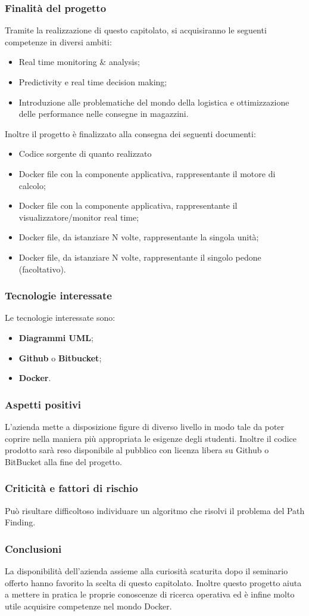 \subsubsection{Finalità del progetto}
Tramite la realizzazione di questo capitolato, si acquisiranno le seguenti competenze in diversi ambiti:
\begin{itemize}
	\item Real time monitoring \& analysis;
	\item Predictivity e real time decision making;
	\item Introduzione alle problematiche del mondo della logistica e ottimizzazione delle performance nelle consegne in magazzini.
\end{itemize}
Inoltre il progetto è finalizzato alla consegna dei seguenti documenti:
\begin{itemize}
	\item Codice sorgente di quanto realizzato
	\item Docker file con la componente applicativa, rappresentante il motore di calcolo;
	\item Docker file con la componente applicativa, rappresentante il visualizzatore/monitor real time;
	\item Docker file, da istanziare N volte, rappresentante la singola unità;
	\item Docker file, da istanziare N volte, rappresentante il singolo pedone (facoltativo).
\end{itemize}
\subsubsection{Tecnologie interessate}
Le tecnologie interessate sono:
\begin{itemize}
	\item \textbf{Diagrammi UML};
	\item \textbf{Github} o \textbf{Bitbucket};
	\item \textbf{Docker}.
\end{itemize}
\subsubsection{Aspetti positivi}
L'azienda mette a disposizione figure di diverso livello in modo tale da poter coprire nella maniera più appropriata le esigenze degli studenti.
Inoltre il codice prodotto sarà reso disponibile al pubblico con licenza libera su Github o BitBucket alla fine del progetto.
\subsubsection{Criticità e fattori di rischio}
Può risultare difficoltoso individuare un algoritmo che risolvi il problema del Path Finding.
\subsubsection{Conclusioni}
La disponibilità dell'azienda assieme alla curiosità scaturita dopo il seminario offerto hanno favorito la scelta di questo capitolato.
Inoltre questo progetto aiuta a mettere in pratica le proprie conoscenze di ricerca operativa ed è infine molto utile acquisire competenze nel mondo Docker.